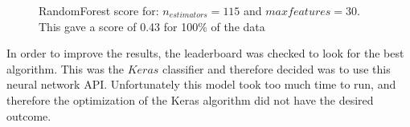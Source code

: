 \documentclass[a4paper,12pt]{article}
\begin{document}
\begin{figure}[H]
\hfill
{}
\hfill
\caption{RandomForest score for: $n_{estimators}=115$ and $max{features}=30$. This gave a score of 0.43 for 100\% of the data}
\label{Q41d}
\end{figure}

In order to improve the results, the leaderboard was checked to look for the best algorithm. This was the $Keras$ classifier and therefore decided was to use this neural network API. Unfortunately this model took too much time to run, and therefore the optimization of the Keras algorithm did not have the desired outcome. 
\end{document}
